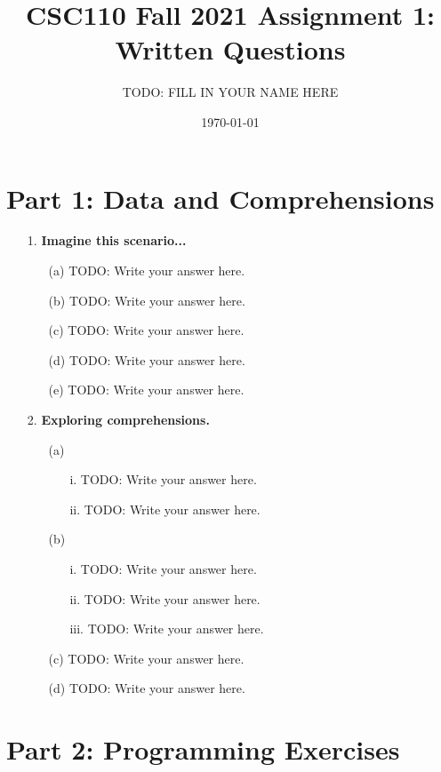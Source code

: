 \documentclass[fontsize=11pt]{article}
\title{CSC110 Fall 2021 Assignment 1: Written Questions}
\author{TODO: FILL IN YOUR NAME HERE}
\date{\today}
\begin{document}
\maketitle

\section*{Part 1: Data and Comprehensions}

\begin{enumerate}
\item[1.] \textbf{Imagine this scenario...}
\begin{enumerate}
\item[(a)]
TODO: Write your answer here.

\item[(b)]
TODO: Write your answer here.

\item[(c)]
TODO: Write your answer here.

\item[(d)]
TODO: Write your answer here.

\item[(e)]
TODO: Write your answer here.
\end{enumerate}

\item[2.] \textbf{Exploring comprehensions.}

\begin{enumerate}
\item[(a)]
\begin{enumerate}
    \item[i.] TODO: Write your answer here.
    \item[ii.] TODO: Write your answer here.
\end{enumerate}
\item[(b)]
\begin{enumerate}
    \item[i.] TODO: Write your answer here.
    \item[ii.] TODO: Write your answer here.
    \item[iii.] TODO: Write your answer here.
\end{enumerate}
\item[(c)]
TODO: Write your answer here.
\item[(d)]
TODO: Write your answer here.
\end{enumerate}
\end{enumerate}

\section*{Part 2: Programming Exercises}
\end{document}
